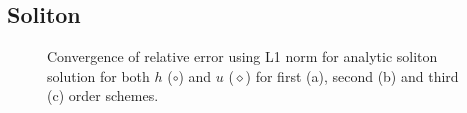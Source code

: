 \documentclass[SingleSpace,12pt]{Serre_ASCE}
\begin{document}
\subsection{Soliton}
\label{section:Convergence Rate}
\subfiglabelskip=0pt
\begin{figure}[htb]
\centering
{}
\caption{Convergence of relative error using L1 norm for analytic soliton solution for both $h$ ($\circ$) and $u$ ($\diamond$) for first (a), second (b) and third (c) order schemes.}
\label{fig:solitoncon}
\end{figure}
\end{document}

